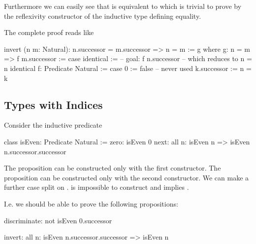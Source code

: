 Furthermore we can easily see that  is equivalent to
 which is trivial to prove by the reflexivity constructor of the
inductive type defining equality.

The complete proof reads like

\begin{alba}
    invert (n m: Natural): n.successor = m.successor => n = m
    :=
        g
        where
            g: n = m => f m.successor :=
                case
                    identical :=
                        -- goal: f n.successor
                        -- which reduces to n = n
                        identical
            f: Predicate Natural :=
                case
                    0 := false  -- never used
                    k.successor := n = k
\end{alba}







\subsection{Types with Indices}

Consider the inductive predicate

\begin{alba}
    class
        isEven: Predicate Natural
    :=
        zero: isEven 0
        next: all n: isEven n => isEven n.successor.successor
\end{alba}

The proposition  can be constructed only with the first
constructor. The proposition  can be constructed only
with the second constructor. We can make a further case split on .
 is impossible to construct and  implies .

I.e. we should be able to prove the following propositions:

\begin{alba}
    discriminate: not isEven 0.successor

    invert: all n: isEven n.successor.successor => isEven n
\end{alba}


